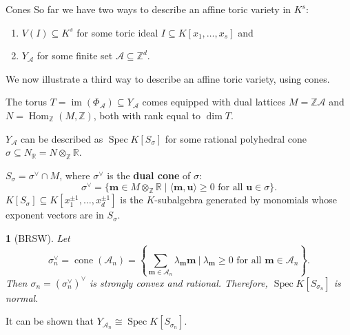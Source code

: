 \documentclass[mathserif
    , handout
   ]{beamer}
\newcommand{\vect}[1]{\mathbf#1}
\newcommand{\Z}{\mathbb Z}
\newcommand{\R}{\mathbb R}
\DeclareMathOperator{\Spec}{Spec}
\DeclareMathOperator{\Hom}{Hom}
\DeclareMathOperator{\im}{im}
\DeclareMathOperator{\cone}{cone}
\theoremstyle{plain}
\newtheorem{thm}{\color{white}{Theorem}}[subsection]
\theoremstyle{definition}
\theoremstyle{remark}
\begin{document}
\begin{frame}
{Cones}%
So far we have two ways to describe an affine toric variety in $K^s$:

\pause
\begin{enumerate}[]
\item $V(I)\subseteq K^s$ for some toric ideal $I\subseteq K[x_1,\dots,x_s]$ and 

\pause
\item $Y_{\mathscr A}$ for some finite set $\mathscr A\subseteq \Z^d$.
\end{enumerate}

\pause
We now illustrate a third way to describe an affine toric variety, using cones.
\end{frame}

\begin{frame}
The torus $T=\im(\Phi_{\mathscr A})\subseteq Y_{\mathscr A}$ comes equipped with dual lattices $M=\Z\mathscr A$ and $N=\Hom_{\Z}(M,\Z)$, both with rank equal to $\dim T$.

\pause
\vspace{0.75pc}
$Y_{\mathscr A}$ can be described as $\Spec K[S_{\sigma}]$ for some rational polyhedral cone $\sigma\subseteq N_{\R}=N\otimes_{\Z}\R$.

\pause
\vspace{0.75pc}
$S_{\sigma}=\sigma^{\vee}\cap M$, where $\sigma^{\vee}$ is the \textbf{dual cone} of $\sigma$:
\[
\sigma^{\vee} = \{\vect m\in M\otimes_{\Z}\R\mid \langle \vect m,\vect u\rangle\geq 0 \text{ for all $\vect u\in\sigma$}\}.
\]
\pause
$K[S_{\sigma}]\subseteq K[x_1^{\pm 1},\dots,x_d^{\pm 1}]$ is the $K$-subalgebra generated by monomials whose exponent vectors are in $S_{\sigma}$.
\end{frame}

\begin{frame}
\begin{thm}[BRSW]
Let 
\[
\sigma_n^{\vee} = \cone(\mathscr A_n) = \left\{\sum_{\vect m\in\mathscr A_n}\lambda_{\vect m}\vect m\ \bigg|\  \lambda_{\vect m}\geq 0\text{ for all $\vect m\in\mathscr A_n$}\right\}.
\]
Then $\sigma_n=(\sigma_n^{\vee})^{\vee}$ is strongly convex and rational.  Therefore, $\Spec K[S_{\sigma_n}]$ is normal. 
\end{thm}

\pause
It can be shown that $Y_{\mathscr A_n}\cong\Spec K[S_{\sigma_n}]$.
\end{frame}
\end{document}
